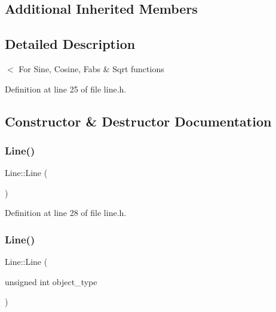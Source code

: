 \subsection*{Additional Inherited Members}


\subsection{Detailed Description}
$<$ For Sine, Cosine, Fabs \& Sqrt functions 

Definition at line 25 of file line.\+h.



\subsection{Constructor \& Destructor Documentation}
\mbox{\label{class_line_acc11b8a429d8cdd63ba6803dff5602b3}} 
\subsubsection{\texorpdfstring{Line()}{Line()}\hspace{0.1cm}{\footnotesize\ttfamily [1/4]}}
{\footnotesize\ttfamily Line\+::\+Line (\begin{DoxyParamCaption}{ }\end{DoxyParamCaption})\hspace{0.3cm}{\ttfamily [inline]}}



Definition at line 28 of file line.\+h.

\mbox{\label{class_line_a4e3242660d8d3c1aa43e932560840552}} 
\subsubsection{\texorpdfstring{Line()}{Line()}\hspace{0.1cm}{\footnotesize\ttfamily [2/4]}}
{\footnotesize\ttfamily Line\+::\+Line (\begin{DoxyParamCaption}\item[{unsigned int}]{object\+\_\+type }\end{DoxyParamCaption})\hspace{0.3cm}{\ttfamily [inline]}}



